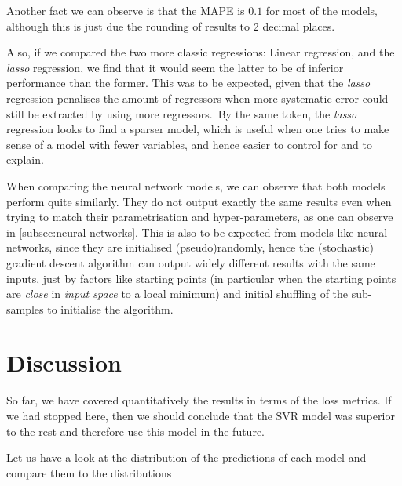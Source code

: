 \documentclass[11pt]{article}
\begin{document}
Another fact we can observe is that the MAPE is $0.1$ for most of the models, although this is just due the
rounding of results to 2 decimal places.

Also, if we compared the two more classic regressions: Linear regression, and the \emph{lasso} regression,
we find that it would seem the latter to be of inferior performance than the former.
This was to be expected, given that the \emph{lasso} regression penalises the amount of regressors when
more systematic error could still be extracted by using more regressors.\ By the same token, the \emph{lasso}
regression looks to find a sparser model, which is useful when one tries to make sense of a model with fewer
variables, and hence easier to control for and to explain.

When comparing the neural network models, we can observe that both models perform quite similarly.
They do not output exactly the same results even when trying to match their parametrisation and hyper-parameters,
as one can observe in \cref{subsec:neural-networks}.
This is also to be expected from models like neural networks, since they are initialised (pseudo)randomly, hence
the (stochastic) gradient descent algorithm can output widely different results with the same inputs, just by
factors like starting points (in particular when the starting points are \emph{close} in \emph{input space} to a
local minimum) and initial shuffling of the sub-samples to initialise the algorithm.




\section{Discussion}\label{sec:discussion}

So far, we have covered quantitatively the results in terms of the loss metrics.
If we had stopped here, then we should conclude that the SVR model was superior to the rest
and therefore use this model in the future.

Let us have a look at the distribution of the predictions of each model and compare them to the
distributions



\end{document}
